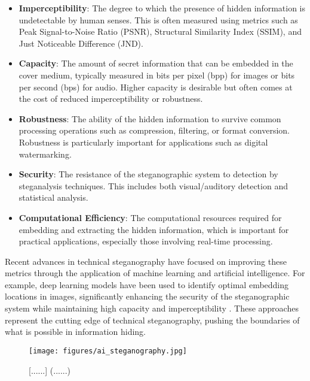\documentclass[12pt, a4paper, oneside]{book}
\begin{document}
\begin{itemize}[leftmargin=*]
    \item \textbf{Imperceptibility}: The degree to which the presence of hidden information is undetectable by human senses. This is often measured using metrics such as Peak Signal-to-Noise Ratio (PSNR), Structural Similarity Index (SSIM), and Just Noticeable Difference (JND).

    \item \textbf{Capacity}: The amount of secret information that can be embedded in the cover medium, typically measured in bits per pixel (bpp) for images or bits per second (bps) for audio. Higher capacity is desirable but often comes at the cost of reduced imperceptibility or robustness.

    \item \textbf{Robustness}: The ability of the hidden information to survive common processing operations such as compression, filtering, or format conversion. Robustness is particularly important for applications such as digital watermarking.

    \item \textbf{Security}: The resistance of the steganographic system to detection by steganalysis techniques. This includes both visual/auditory detection and statistical analysis.

    \item \textbf{Computational Efficiency}: The computational resources required for embedding and extracting the hidden information, which is important for practical applications, especially those involving real-time processing.
\end{itemize}

Recent advances in technical steganography have focused on improving these metrics through the application of machine learning and artificial intelligence. For example, deep learning models have been used to identify optimal embedding locations in images, significantly enhancing the security of the steganographic system while maintaining high capacity and imperceptibility \cite{WuZhang2022}. These approaches represent the cutting edge of technical steganography, pushing the boundaries of what is possible in information hiding.

\begin{figure}[htbp]
    \centering
    \texttt{[image: figures/ai\_steganography.jpg]}
    \caption{[......] (......)}
    \label{fig:ai_steganography}
\end{figure}
\end{document}
